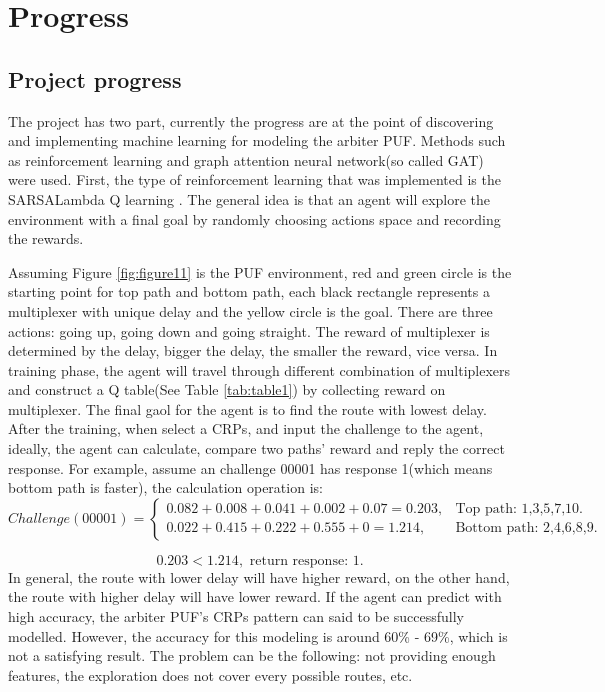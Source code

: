 \chapter{Progress}

\section{Project progress}
The project has two part, currently the progress are at the point of discovering and implementing machine learning for modeling the arbiter PUF. Methods such as reinforcement learning
and graph attention neural network(so called GAT) were used. First, the type of reinforcement learning that was implemented is the SARSALambda Q learning \cite{Reference9}. The general idea is that an agent will 
explore the environment with a final goal by randomly choosing actions space and recording the rewards. 

Assuming Figure \ref{fig:figure11} is the PUF environment, red and green circle is the starting point for top path and bottom path, each black rectangle represents a multiplexer with unique delay and the yellow 
circle is the goal. There are three actions: going up, going down and going straight. The reward of multiplexer is determined by the delay, bigger the delay, the smaller the reward, vice versa. In training phase, 
the agent will travel through different combination of multiplexers and construct a Q table(See Table \ref{tab:table1}) by collecting reward on multiplexer. The final gaol for the agent is to find the route with 
lowest delay. After the training, when select a CRPs, and input the challenge to the agent, ideally, the agent can calculate, compare two paths' reward and reply the correct response. For example, assume 
an challenge 00001 has response 1(which means bottom path is faster), the calculation operation is:
\begin{equation}
    Challenge(00001) =\begin{cases}
    0.082+0.008+0.041+0.002+0.07 = 0.203, & \text {Top path: 1,3,5,7,10}.\\
    0.022+0.415+0.222+0.555+0 = 1.214, & \text {Bottom path: 2,4,6,8,9}.
    \end{cases}
\end{equation}

\begin{equation}
    0.203 < 1.214, \text { return response: 1}.
\end{equation}
In general, the route with lower delay will have higher reward, on the other hand, the route with higher delay will have lower reward. If the agent can predict with high accuracy, the arbiter PUF's CRPs pattern can said to 
be successfully modelled. However, the accuracy for this modeling is around 60\% - 69\%, which is not a satisfying result. The problem can be the following: not providing enough features, the exploration does not 
cover every possible routes, etc.

